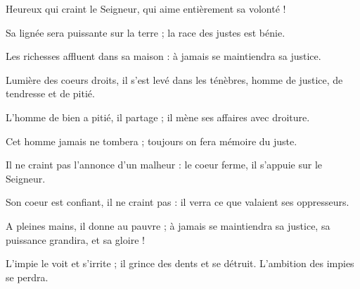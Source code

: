 \item Heureux qui craint le Seigneur, qui aime entièrement sa volonté !

\item Sa lignée sera puissante sur la terre ; la race des justes est bénie.

\item Les richesses affluent dans sa maison : à jamais se maintiendra sa justice.

\item Lumière des coeurs droits, il s'est levé dans les ténèbres, homme de justice, de tendresse et de pitié.

\item L'homme de bien a pitié, il partage ; il mène ses affaires avec droiture.

\item Cet homme jamais ne tombera ; toujours on fera mémoire du juste.

\item Il ne craint pas l'annonce d'un malheur : le coeur ferme, il s'appuie sur le Seigneur.

\item Son coeur est confiant, il ne craint pas : il verra ce que valaient ses oppresseurs.

\item A pleines mains, il donne au pauvre ; à jamais se maintiendra sa justice, sa puissance grandira, et sa gloire !

\item L'impie le voit et s'irrite ; il grince des dents et se détruit. L'ambition des impies se perdra.
